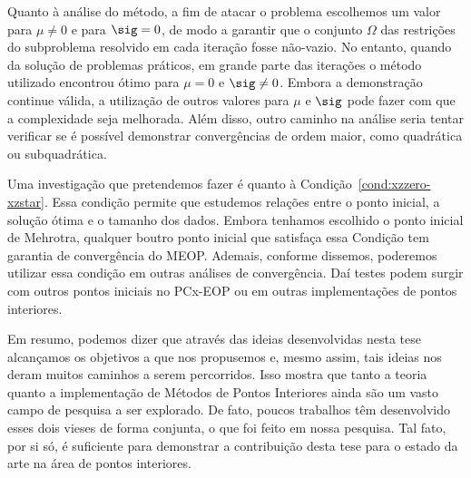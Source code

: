 Quanto à análise do método, a fim de atacar o problema escolhemos um valor para $\mu\neq 0$ e para $\sig = 0$, de modo a garantir que o conjunto $\Omega$ das restrições do subproblema resolvido em cada iteração fosse não-vazio.  No entanto, quando da solução de problemas práticos, em grande parte das iterações o método utilizado encontrou ótimo para $\mu=0$ e $\sig\neq 0$. Embora a demonstração continue válida, a utilização de outros valores para $\mu$ e $\sig$ pode fazer com que a complexidade seja melhorada. Além disso, outro caminho na análise seria tentar verificar se é possível demonstrar convergências de ordem maior, como quadrática ou subquadrática. 

Uma investigação  que pretendemos fazer é quanto à Condição~\ref{cond:xzzero-xzstar}. Essa condição permite que estudemos relações entre o ponto inicial, a solução ótima e o tamanho dos dados. Embora tenhamos escolhido o ponto inicial de Mehrotra, qualquer   boutro ponto inicial que satisfaça essa Condição tem garantia de convergência do MEOP. Ademais, conforme dissemos, poderemos utilizar essa condição em outras análises de convergência. Daí testes podem surgir com outros pontos iniciais no PCx-EOP ou em outras implementações de pontos interiores.



Em resumo, podemos dizer que através das ideias desenvolvidas nesta tese alcançamos os objetivos a que nos propusemos e, mesmo assim, tais ideias  nos deram muitos caminhos a serem percorridos. Isso mostra que tanto  a teoria quanto a implementação de Métodos de Pontos Interiores ainda são um vasto campo de pesquisa a ser explorado. De fato, poucos trabalhos têm desenvolvido esses dois vieses de forma conjunta, o que foi feito  em nossa pesquisa. Tal fato, por si só, é suficiente para demonstrar a contribuição desta tese para o estado da arte na área de pontos interiores. 